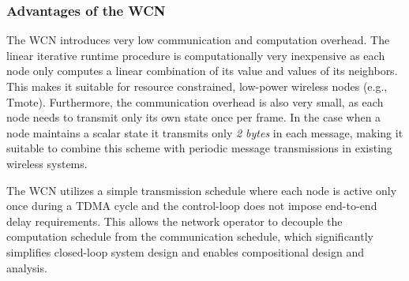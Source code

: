 \subsubsection{Advantages of the WCN}
The WCN introduces very low communication and computation overhead. The linear iterative runtime procedure is computationally very inexpensive as each node only computes a linear combination of its value and values of its neighbors. This makes it suitable for resource constrained, low-power wireless nodes (e.g., Tmote).
Furthermore, the communication overhead is also very small, as each node needs to transmit only its own state once per frame.  In the case when a node maintains a scalar state it transmits only \emph{2 bytes} in each message, making it suitable to combine this scheme with periodic message transmissions in existing wireless systems. 

The WCN utilizes a simple transmission schedule where each node is active only once during a TDMA cycle and the control-loop does not impose end-to-end delay requirements. This allows the network operator to decouple the computation schedule from the communication schedule, which significantly simplifies closed-loop system design and enables compositional design and analysis. 